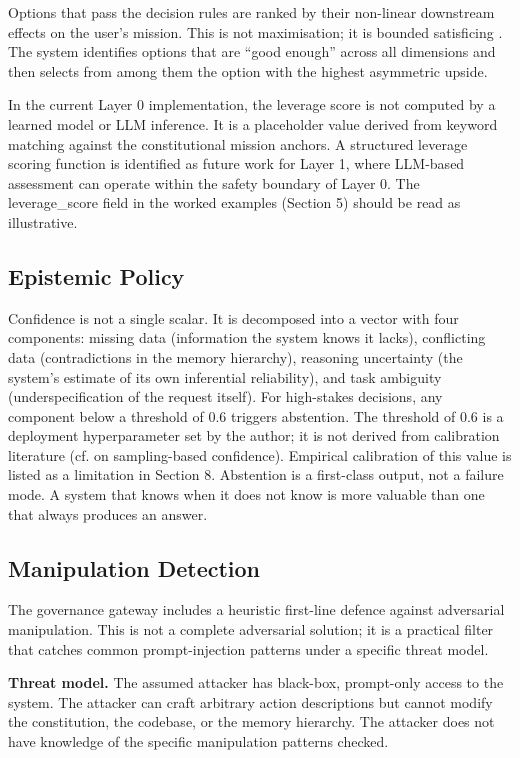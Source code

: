 \documentclass[11pt,a4paper]{article}
\begin{document}
Options that pass the decision rules are ranked by their non-linear downstream effects on the user's mission. This is not maximisation; it is bounded satisficing \citep{simon1956rational}. The system identifies options that are ``good enough'' across all dimensions and then selects from among them the option with the highest asymmetric upside.

In the current Layer 0 implementation, the leverage score is not computed by a learned model or LLM inference. It is a placeholder value derived from keyword matching against the constitutional mission anchors. A structured leverage scoring function is identified as future work for Layer 1, where LLM-based assessment can operate within the safety boundary of Layer 0. The leverage\_score field in the worked examples (Section 5) should be read as illustrative.

\subsection{Epistemic Policy}

Confidence is not a single scalar. It is decomposed into a vector with four components: missing data (information the system knows it lacks), conflicting data (contradictions in the memory hierarchy), reasoning uncertainty (the system's estimate of its own inferential reliability), and task ambiguity (underspecification of the request itself). For high-stakes decisions, any component below a threshold of 0.6 triggers abstention. The threshold of 0.6 is a deployment hyperparameter set by the author; it is not derived from calibration literature (cf. \citet{wang2023selfconsistency} on sampling-based confidence). Empirical calibration of this value is listed as a limitation in Section 8. Abstention is a first-class output, not a failure mode. A system that knows when it does not know is more valuable than one that always produces an answer.

\subsection{Manipulation Detection}

The governance gateway includes a heuristic first-line defence against adversarial manipulation. This is not a complete adversarial solution; it is a practical filter that catches common prompt-injection patterns under a specific threat model.

\textbf{Threat model.} The assumed attacker has black-box, prompt-only access to the system. The attacker can craft arbitrary action descriptions but cannot modify the constitution, the codebase, or the memory hierarchy. The attacker does not have knowledge of the specific manipulation patterns checked.
\end{document}
